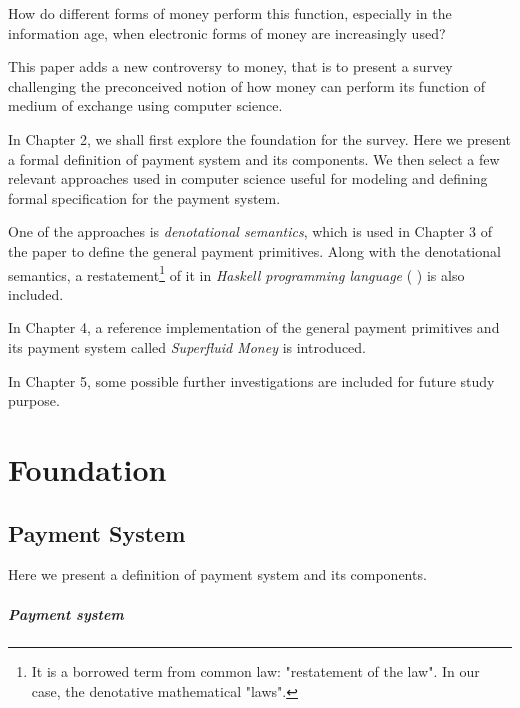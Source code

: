 \documentclass[a4paper,10pt]{report}
\begin{document}
How do different forms of money perform this function, especially in the information age, when electronic forms of money
are increasingly used?

This paper adds a new controversy to money, that is to present a survey challenging the preconceived notion of how money
can perform its function of medium of exchange using computer science.

In Chapter 2, we shall first explore the foundation for the survey. Here we present a formal definition of payment
system and its components. We then select a few relevant approaches used in computer science useful for modeling and
defining formal specification for the payment system.

One of the approaches is \textit{denotational semantics}, which is used in Chapter 3 of the paper to define the general
payment primitives. Along with the denotational semantics, a restatement\footnote{It is a borrowed term from common law:
"restatement of the law". In our case, the denotative mathematical "laws".} of it in \textit{Haskell programming
    language} (\cite{hudak1992report} \cite{jones2003haskell} \cite{marlow2010haskell}) is also included.

In Chapter 4, a reference implementation of the general payment primitives and its payment system called
\textit{Superfluid Money} is introduced.

In Chapter 5, some possible further investigations are included for future study purpose.

\chapter{Foundation}

\section{Payment System}

Here we present a definition of payment system and its components.

\paragraph{Payment system}
\end{document}
